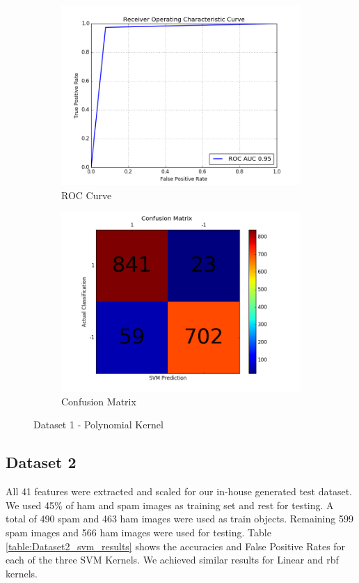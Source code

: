 \begin{figure}[h]
	
	\begin{subfigure}{0.5\textwidth}
		\includegraphics[width=0.9\linewidth]{images/AUC-Dataset1-poly} 
		\caption{ROC Curve}
		\label{fig:AUC_Dataset1_poly}
	\end{subfigure}
	\begin{subfigure}{0.5\textwidth}
		\includegraphics[width=0.9\linewidth]{images/CM-Dataset1-poly}
		\caption{Confusion Matrix}
		\label{fig:CM_Dataset1_poly}
	\end{subfigure}
	
	\caption{Dataset 1 - Polynomial Kernel}
	\label{fig:Dataset1_poly_results}
\end{figure}




\subsection{Dataset 2}
\par All 41 features were extracted and scaled for our in-house generated test dataset. We used 45\% of ham and spam images as training set and rest for testing. A total of 490 spam and 463 ham images were used as train objects. Remaining 599 spam images and 566 ham images were used for testing. Table \ref{table:Dataset2_svm_results} shows the accuracies and False Positive Rates for each of the three SVM Kernels. We achieved similar results for Linear and rbf kernels.


